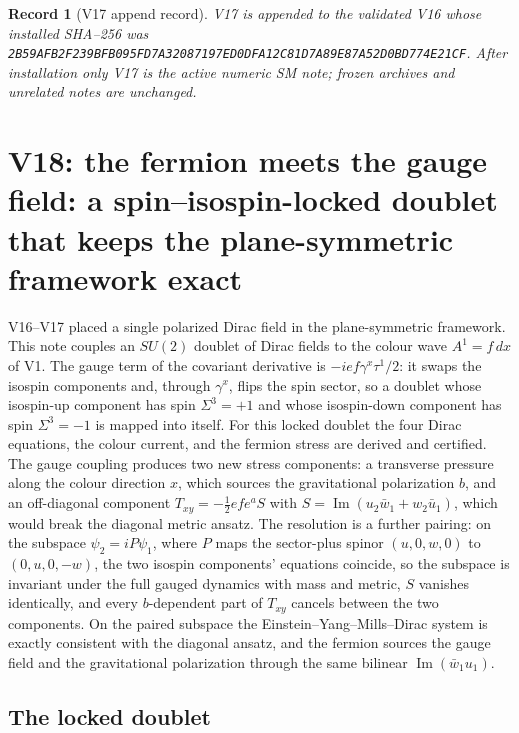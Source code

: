 \documentclass[11pt]{article}
\newtheorem{record}[theorem]{Record}
\theoremstyle{remark}
\begin{document}
\begin{record}[V17 append record]
\label{rec:v20v17}
V17 is appended to the validated V16 whose installed SHA--256 was
\texttt{2B59AFB2F239BFB095FD7A32087197ED0DFA12C81D7A89E87A52D0BD774E21CF}.
After installation only V17 is the active numeric SM note; frozen
archives and unrelated notes are unchanged.
\end{record}


\section{V18: the fermion meets the gauge field: a spin--isospin-locked doublet that keeps the plane-symmetric framework exact}
\label{sec:v20v18}

V16--V17 placed a single polarized Dirac field in the plane-symmetric
framework.  This note couples an \(SU(2)\) doublet of Dirac fields to
the colour wave \(A^1=f\,dx\) of V1.  The gauge term of the covariant
derivative is \(-ief\gamma^x\tau^1/2\): it swaps the isospin components
and, through \(\gamma^x\), flips the spin sector, so a doublet whose
isospin-up component has spin \(\Sigma^3=+1\) and whose isospin-down
component has spin \(\Sigma^3=-1\) is mapped into itself.  For this
locked doublet the four Dirac equations, the colour current, and the
fermion stress are derived and certified.  The gauge coupling
produces two new stress components: a transverse pressure along the
colour direction \(x\), which sources the gravitational polarization
\(b\), and an off-diagonal component \(T_{xy}=-\tfrac12efe^aS\) with
\(S=\operatorname{Im}(u_2\bar w_1+w_2\bar u_1)\), which would break the
diagonal metric ansatz.  The resolution is a further pairing: on the
subspace \(\psi_2=iP\psi_1\), where \(P\) maps the sector-plus spinor
\((u,0,w,0)\) to \((0,u,0,-w)\), the two isospin components' equations
coincide, so the subspace is invariant under the full gauged dynamics
with mass and metric, \(S\) vanishes identically, and every
\(b\)-dependent part of \(T_{xy}\) cancels between the two components.
On the paired subspace the Einstein--Yang--Mills--Dirac system is
exactly consistent with the diagonal ansatz, and the fermion sources
the gauge field and the gravitational polarization through the same
bilinear \(\operatorname{Im}(\bar w_1u_1)\).

\subsection{The locked doublet}
\end{document}

